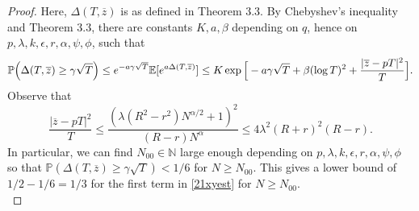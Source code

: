\begin{proof}
		Here, $\Delta(T,\overline{z})$ is as defined in Theorem 3.3. By Chebyshev's inequality and Theorem 3.3, there are constants $K,a,\beta$ depending on $q$, hence on $p,\lambda,k,\epsilon,r,\alpha,\psi,\phi$, such that 
		\begin{align*}
		\mathbb{P}\Big(\Delta(T,\overline{z}) \geq \gamma\sqrt{T}\Big) \leq e^{-a\gamma\sqrt{T}}\mathbb{E}[e^{a\Delta(T,\overline{z})}] \leq K\exp\Big[-a\gamma\sqrt{T} + \beta(\log T)^2 + \frac{|\overline{z} - pT|^2}{T}\Big].
		\end{align*}
		Observe that
		\[
		\frac{|\overline{z} - pT|^2}{T} \leq \frac{(\lambda(R^2-r^2) N^{\alpha/2} + 1)^2}{(R-r)N^\alpha} \leq 4\lambda^2(R+r)^2(R-r).
		\]
		In particular, we can find $N_{00}\in\mathbb{N}$ large enough depending on $p,\lambda,k,\epsilon,r,\alpha,\psi,\phi$ so that $\mathbb{P}(\Delta(T,\overline{z})\geq \gamma\sqrt{T})<1/6$ for $N\geq N_{00}$. This gives a lower bound of $1/2 - 1/6 = 1/3$ for the first term in \eqref{21xyest} for $N\geq N_{00}$.\\
		

\end{proof}
